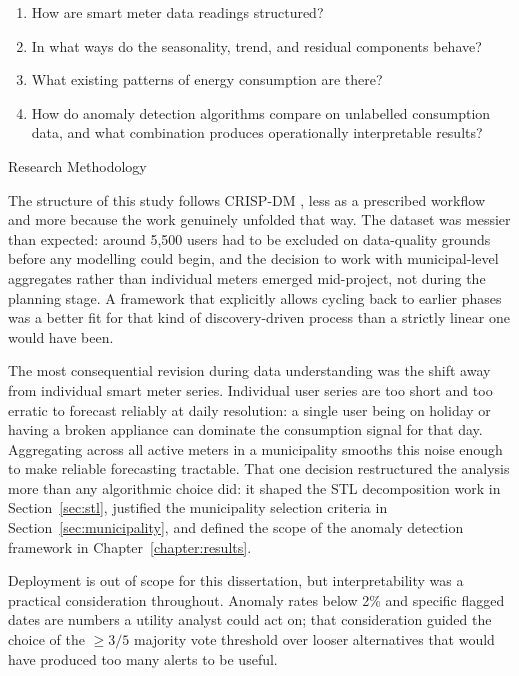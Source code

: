 ﻿\documentclass[12pt,reqno, twoside]{amsbook}
\makeatletter
\numberwithin{figure}{chapter}
\numberwithin{table}{chapter}
\numberwithin{equation}{chapter}
\def\section{\@startsection{section}{1}%
      \z@{.5\linespacing\@plus.7\linespacing}{.25\linespacing}%
      {\normalfont\bfseries\flushleft}}
\theoremstyle{plain}
\numberwithin{equation}{chapter}
\numberwithin{section}{chapter}
\makeatother
\begin{document}
\begin{enumerate}[leftmargin=1.5cm,label=RQ\arabic*:,itemsep=.5ex]
                 \item How are smart meter data readings structured?
              \item In what ways do the seasonality, trend, and residual components behave?
                 \item What existing patterns of energy consumption are there?
                \item How do anomaly detection algorithms compare on unlabelled consumption data, and what combination produces operationally interpretable results?
\end{enumerate}

\section{Research Methodology}
\label{section:methodology}

The structure of this study follows \ac{CRISP-DM} \cite{wirth_crisp_2000}, less as a prescribed workflow and more because the work genuinely unfolded that way. The dataset was messier than expected: around 5,500 users had to be excluded on data-quality grounds before any modelling could begin, and the decision to work with municipal-level aggregates rather than individual meters emerged mid-project, not during the planning stage. A framework that explicitly allows cycling back to earlier phases was a better fit for that kind of discovery-driven process than a strictly linear one would have been.

The most consequential revision during data understanding was the shift away from individual smart meter series. Individual user series are too short and too erratic to forecast reliably at daily resolution: a single user being on holiday or having a broken appliance can dominate the consumption signal for that day. Aggregating across all active meters in a municipality smooths this noise enough to make reliable forecasting tractable. That one decision restructured the analysis more than any algorithmic choice did: it shaped the \ac{STL} decomposition work in Section~\ref{sec:stl}, justified the municipality selection criteria in Section~\ref{sec:municipality}, and defined the scope of the anomaly detection framework in Chapter~\ref{chapter:results}.

Deployment is out of scope for this dissertation, but interpretability was a practical consideration throughout. Anomaly rates below 2\% and specific flagged dates are numbers a utility analyst could act on; that consideration guided the choice of the $\geq 3/5$ majority vote threshold over looser alternatives that would have produced too many alerts to be useful.
\end{document}
